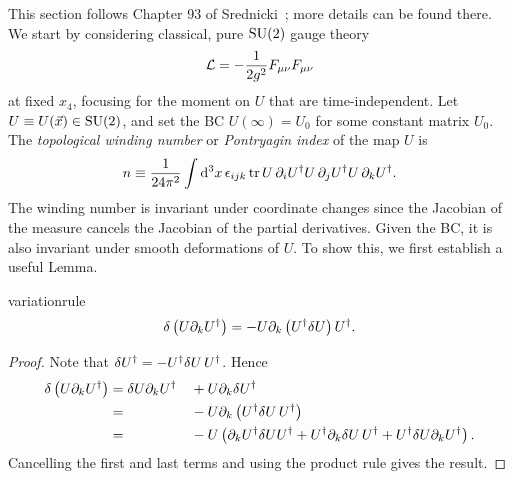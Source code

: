 This section follows Chapter 93 of Srednicki~\cite{srednicki_quantum_2007}; 
more details can be found there.
We start by considering classical, pure $\operatorname{SU}(2)$ gauge theory
\begin{equation}\label{eq:topaction}
  \mathcal{L}=-\frac{1}{2g^2}F_{\mu\nu}F_{\mu\nu}
\end{equation}
at fixed $x_4$, focusing for the moment on $U$ that are time-independent.
Let $U\equiv U(\vec{x})\in\operatorname{SU}(2)$, and set the BC $U(\infty)=U_0$
for some constant matrix $U_0$. 
The {\it topological winding number} 
or {\it Pontryagin index} of the map $U$ is
\begin{equation}\label{eq:wn}
  n\equiv\frac{1}{24\pi^2}\int\dd[3]{x}\epsilon_{ijk}
    \tr U\,\partial_iU^\dagger U\,\partial_jU^\dagger
        U\,\partial_kU^\dagger.
\end{equation}
The winding number is invariant under coordinate changes since the Jacobian of
the measure cancels the Jacobian of the partial derivatives.
Given the BC, it is also invariant under smooth deformations of $U$. 
To show this, we first establish a useful Lemma.

\begin{lemma}{}{variationrule}
  $$\var\left(U\partial_kU^\dagger\right)
   =-U\partial_k\left(U^\dagger\var U\right)U^\dagger.$$
\begin{proof} Note that $\var U^\dagger=-U^\dagger\var U\,U^\dagger$. Hence
  \begin{alignat*}{2}
   \var\left(U\partial_kU^\dagger\right)
    &=\var U\partial_kU^\dagger&&+U\partial_k\var U^\dagger\\
    &=                           &&-U\partial_k\left(U^\dagger\var
                                                     U\,U^\dagger\right)\\
    &=                           &&-U\left(\partial_kU^\dagger\var UU^\dagger
                                        +U^\dagger\partial_k\var U\,U^\dagger
                                        +U^\dagger\var U\partial_k
                                         U^\dagger                     \right).
  \end{alignat*}
  Cancelling the first and last terms and using the product rule gives the
  result.
\end{proof}
\end{lemma}

